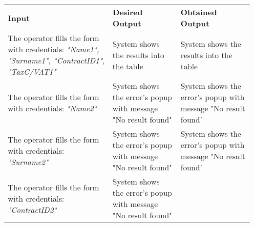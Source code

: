 {{{\begin{center}
			\begin{tabular}{|p{4cm}|p{5cm}|p{5cm}|}
			\hline
			\centering \vspace{1mm} \bfseries{Input} \vspace{1mm} & \vspace{1mm} \bfseries{Desired Output} \vspace{1mm} & \vspace{1mm} \bfseries{Obtained Output} \vspace{1mm}\\
			\hline
				\vspace{1mm} The operator fills the form with credentials: \itshape{"Name1", "Surname1", "ContractID1", "TaxC/VAT1"} \vspace{1mm} &
				\vspace{1mm} System shows the results into the table \vspace{1mm} & 
				\vspace{1mm} System shows the results into the table \vspace{1mm} \\
			\hline
				\vspace{1mm} The operator fills the form with credentials: \itshape{"Name2"} \vspace{1mm} &
				\vspace{1mm} System shows the error's popup with message "No result found" \vspace{1mm} & 
				\vspace{1mm} System shows the error's popup with message "No result found" \vspace{1mm} \\
			\hline
				\vspace{1mm} The operator fills the form with credentials: \itshape{"Surname2"} \vspace{1mm} &
				\vspace{1mm} System shows the error's popup with message "No result found" \vspace{1mm} & 
				\vspace{1mm} System shows the error's popup with message "No result found" \vspace{1mm} \\
			\hline
				\vspace{1mm} The operator fills the form with credentials: \itshape{"ContractID2"} \vspace{1mm} &
				\vspace{1mm} System shows the error's popup with message "No result found" \vspace{1mm} & 

\end{tabular}
\end{center}}}}
